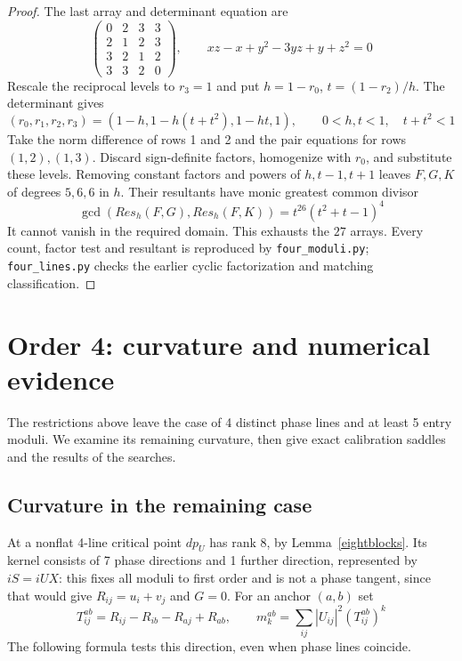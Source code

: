 \documentclass[11pt,a4paper]{article}
\begin{document}
\begin{proof}
The last array and determinant equation are
\[
 \begin{pmatrix}0&2&3&3\\2&1&2&3\\3&2&1&2\\3&3&2&0\end{pmatrix},
 \qquad xz-x+y^2-3yz+y+z^2=0
\]
Rescale the reciprocal levels to $r_3=1$ and put
$h=1-r_0$, $t=(1-r_2)/h$. The determinant gives
\[
 (r_0,r_1,r_2,r_3)=(1-h,1-h(t+t^2),1-ht,1),
 \qquad 0<h,t<1,\quad t+t^2<1
\]
Take the norm difference of rows 1 and 2 and the pair equations for
rows $(1,2),(1,3)$. Discard sign-definite factors, homogenize with
$r_0$, and substitute these levels. Removing constant factors and
powers of $h,t-1,t+1$ leaves $F,G,K$ of degrees $5,6,6$ in $h$.
Their resultants have monic greatest common divisor
\[
 \gcd(Res_h(F,G),Res_h(F,K))
 =t^{26}(t^2+t-1)^4
\]
It cannot vanish in the required domain. This exhausts the $27$ arrays.
Every count, factor test and resultant is reproduced by
\texttt{four\_moduli.py}; \texttt{four\_lines.py} checks the earlier
cyclic factorization and matching classification.
\end{proof}

\section{Order 4: curvature and numerical evidence}\label{fourcurvature}
The restrictions above leave the case of 4 distinct phase lines and
at least 5 entry moduli. We examine its remaining curvature, then
give exact calibration saddles and the results of the searches.

\subsection{Curvature in the remaining case}\label{curvaturesection}
At a nonflat 4-line critical point $dp_U$ has rank 8, by
Lemma~\ref{eightblocks}. Its kernel consists of 7 phase directions
and 1 further direction, represented by $iS=iUX$: this fixes all
moduli to first order and is not a phase tangent, since that would give
$R_{ij}=u_i+v_j$ and $G=0$.
For an anchor $(a,b)$ set
\[
 T^{ab}_{ij}=R_{ij}-R_{ib}-R_{aj}+R_{ab},\qquad
 m_k^{ab}=\sum_{ij}|U_{ij}|^2(T^{ab}_{ij})^k
\]
The following formula tests this direction, even when phase lines coincide.
\end{document}
